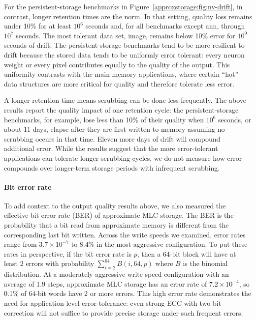 For the
persistent-storage benchmarks in Figure~\ref{approxstorage:fig:nv-drift}, in contrast, longer retention times are the
norm.
In that setting, quality loss remains under 10\% for at least
$10^6$ seconds and, for all benchmarks except \textsf{ann}, through $10^7$ seconds.
The most tolerant data set, \textsf{image}, remains below 10\% error for
$10^9$ seconds of drift.
The persistent-storage benchmarks tend to be more resilient to drift because
the stored data tends to be uniformly error tolerant: every neuron weight or
every pixel contributes equally to the quality of the output.
This uniformity contrasts with the main-memory applications, where certain
``hot'' data structures are more critical for quality and therefore
tolerate less error.

A longer retention time means scrubbing can be done less frequently.
The above results report the quality impact of one retention cycle:
the persistent-storage benchmarks, for example, lose less than 10\%
of their quality when $10^6$ seconds, or about 11 days, elapse after they are
first written to memory assuming no scrubbing occurs in that time.
Eleven more days of drift will compound additional error.
While the results suggest that the more error-tolerant applications can
tolerate longer scrubbing cycles, we do not measure how error compounds over
longer-term storage periods with infrequent scrubbing.

\paragraph{Bit error rate}

To add context to the output quality results above, we also measured the
effective bit error rate (BER) of approximate MLC storage. The BER is the
probability that a bit read from approximate memory is different from
the corresponding last bit written.
Across the write speeds we examined, error rates range from $3.7
\times 10^{-7}$ to $8.4\%$ in the most aggressive configuration.
%
To put these rates in perspective, if the bit error rate is $p$, then a 64-bit
block will have at least 2 errors with probability $\sum_{i = 2}^{64} B(i, 64,
p)$ where $B$ is the binomial distribution. At a moderately aggressive write
speed configuration with an average of 1.9 steps, approximate MLC storage has
an error rate of $7.2 \times 10^{-4}$, so 0.1\% of 64-bit
words have 2 or more errors. This high error rate demonstrates the need
for application-level error tolerance: even strong ECC with two-bit correction
will not suffice to provide precise storage under such frequent errors.


